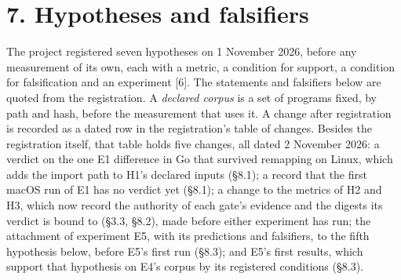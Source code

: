 \documentclass[10pt,letterpaper]{article}
\begin{document}
\section{7. Hypotheses and falsifiers}\label{hypotheses-and-falsifiers}

The project registered seven hypotheses on 1 November 2026, before any
measurement of its own, each with a metric, a condition for support, a
condition for falsification and an experiment {[}6{]}. The statements
and falsifiers below are quoted from the registration. A \emph{declared
corpus} is a set of programs fixed, by path and hash, before the
measurement that uses it. A change after registration is recorded as a
dated row in the registration's table of changes. Besides the
registration itself, that table holds five changes, all dated 2 November
2026: a verdict on the one E1 difference in Go that survived remapping
on Linux, which adds the import path to H1's declared inputs (§8.1); a
record that the first macOS run of E1 has no verdict yet (§8.1); a
change to the metrics of H2 and H3, which now record the authority of
each gate's evidence and the digests its verdict is bound to (§3.3,
§8.2), made before either experiment has run; the attachment of
experiment E5, with its predictions and falsifiers, to the fifth
hypothesis below, before E5's first run (§8.3); and E5's first results,
which support that hypothesis on E4's corpus by its registered
conditions (§8.3).
\end{document}

